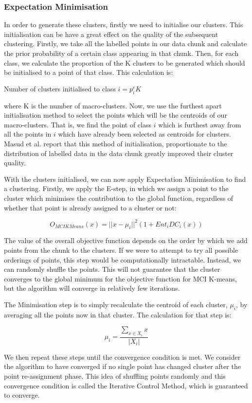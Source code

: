 \documentclass[12pt,a4paper,oneside]{report}
\begin{document}
 \subsubsection{Expectation Minimisation} 
 In order to generate these clusters, firstly we need to initialise our clusters. This initialisation can be have a great effect on the quality of the subsequent clustering. Firstly, we take all the labelled points in our data chunk and calculate the prior probability of a certain class appearing in that chunk. Then, for each class, we calculate the proportion of the K clusters to be generated which should be initialised to a point of that class. This calculation is:
 
Number of clusters initialised to class \(i  = p_i^cK\) 

where K is the number of macro-clusters. Now, we use the furthest apart initialisation method to select the points which will be the centroids of our macro-clusters. That is, we find the point of class \(i\) which is furthest away from all the points in \(i\) which have already been selected as centroids for clusters. Masud et al. report that this method of initialisation, proportionate to the distribution of labelled data in the data chunk greatly improved their cluster quality.\cite{TechRep}

With the clusters initialised, we can now apply Expectation Minimisation to find a clustering. Firstly, we apply the E-step, in which we assign a point to the cluster which minimises the contribution to the global function, regardless of whether that point is already assigned to a cluster or not: 

 \[O_{MCIKMeans}(x) = || x - \mu_i||^2(1 + Ent_iDC_i(x)) \]
 
The value of the overall objective function depends on the order by which we add points from the chunk to the clusters. If we were to attempt to try all possible orderings of points, this step would be computationally intractable. Instead, we can randomly shuffle the points. This will not guarantee that the cluster converges to the global minimum for the objective function for MCI K-means, but the algorithm will converge in relatively few iterations. 

The Minimisation step is to simply recalculate the centroid of each cluster, \(\mu_i\), by averaging all the points now in that cluster. The calculation for that step is: 

\[\mu_i = \frac{\sum_{x \in X_i}x}{|X_i|}\]

We then repeat these steps until the convergence condition is met. We consider the algorithm to have converged if no single point has changed cluster after the point re-assignment phase. This idea of shuffling points randomly and this convergence condition is called the Iterative Control Method, which is guaranteed to converge.\cite{ICM}  
 
\end{document}
